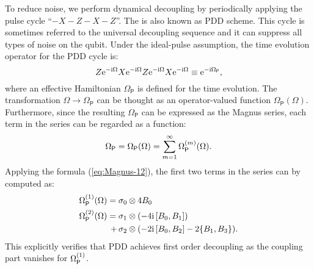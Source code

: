 \documentclass[aps,pra,reprint,superscriptaddress]{revtex4-2}
\newcommand{\Opdd}{\Omega_{\mathsf{P}}}
\begin{document}
 



To reduce noise, we perform dynamical decoupling by periodically
applying the pulse cycle ``$-X-Z-X-Z$''.
The is also known as PDD scheme.
This cycle is sometimes referred to the universal decoupling sequence and it can suppress all types of noise on the qubit. 
Under the ideal-pulse assumption, the time evolution operator for the PDD cycle is:
\begin{equation}
Z \upe^{-\upi \Omega} X \upe^{-\upi \Omega} Z \upe^{-\upi \Omega} X \upe^{-\upi \Omega} 
\equiv \upe^{-\upi\Opdd},
\end{equation}
where an effective Hamiltonian $\Opdd$ is defined for the time evolution. The  transformation $\Omega\to\Opdd$ can be thought as an operator-valued function $\Opdd(\Omega)$.
Furthermore, since the resulting $\Opdd$ can be expressed as the Magnus series, 
each term in the series can be regarded as a function:
\begin{equation}\label{eq:PDD-update}
    \Opdd = \Opdd(\Omega) = \sum_{m=1}^\infty \Opdd\up{m}(\Omega).
\end{equation}
Applying the formula (\ref{eq:Magnus-12}), the first two terms in the series can by computed as:
\begin{align}\label{eq:PDD-magnus-1}
\Opdd\up{1}(\Omega) ={}  &\sigma_0 \otimes 4B_0 \\
\Opdd\up{2}(\Omega) ={} &\sigma_1 \otimes (-4\upi\,[B_0,B_1]) \notag \\
+\, &\sigma_2 \otimes (-2\upi\,[B_0,B_2] - 2\{B_1,B_3\}).\label{eq:PDD-magnus-2}
\end{align}
This explicitly verifies that PDD achieves first order decoupling as the coupling part vanishes for $\Opdd\up{1}$. 
\end{document}
